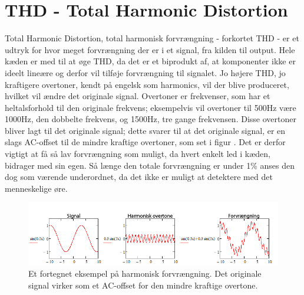\section{THD - Total Harmonic Distortion}
\label{thd}
Total Harmonic Distortion, total harmonisk forvrængning - forkortet THD - er et udtryk for hvor meget forvrængning der er i et signal, fra kilden til output.  Hele kæden er med til at øge THD, da det er et biprodukt af, at komponenter ikke er ideelt lineære og derfor vil tilføje forvrængning til signalet. Jo højere THD, jo kraftigere overtoner, kendt på engelsk som harmonics, vil der blive produceret, hvilket vil ændre det originale signal. Overtoner er frekvenser, som har et heltalsforhold til den originale frekvens; eksempelvis vil overtoner til 500Hz være 1000Hz, den dobbelte frekvens, og 1500Hz, tre gange frekvensen. Disse overtoner bliver lagt til det originale signal; dette svarer til at det originale signal, er en slags AC-offset til de mindre kraftige overtoner, som set i figur . Det er derfor vigtigt at få så lav forvrængning som muligt, da hvert enkelt led i kæden, bidrager med sin egen. Så længe den totale forvrængning er under 1\% anses den dog som værende underordnet, da det ikke er muligt at detektere med det menneskelige øre.

\begin{figure}[h]
\centering
\includegraphics[scale=.75]{indledende_analyse/thd/thd.png}
\caption{Et fortegnet eksempel på harmonisk forvrængning. Det originale signal virker som et AC-offset for den mindre kraftige overtone.}
\label{fig:harmonic_distortion}
\end{figure}
